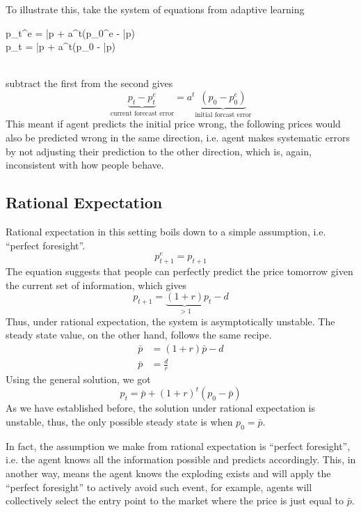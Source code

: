 \documentclass[twocolumn, fleqn]{article}
\begin{document}
				To illustrate this, take the system of equations from adaptive learning\\[4pt]
				\begin{cases}
						p_t^e = \bar{p} + a^t(p_0^e - \bar{p})\\
						p_t = \bar{p} + a^t(p_0 - \bar{p})
				\end{cases}\\[4pt]
				subtract the first from the second gives
				\begin{equation*}
						\underbrace{p_t - p_t^e}_{\text{current forecast error}} = a^t \underbrace{(p_0-p_0^e)}_{
						\text{initial
						forcast error}}
				\end{equation*}
				This meant if agent predicts the initial price wrong, the following prices would also be predicted wrong in the same direction, i.e. agent makes systematic errors by not adjusting their prediction to the other direction, which is, again, inconsistent with how people behave.

		\subsection{Rational Expectation}

			Rational expectation in this setting boils down to a simple assumption, i.e. ``perfect foresight''.
			\begin{equation*}
				p_{t+1}^e = p_{t+1}
			\end{equation*}
			The equation suggests that people can perfectly predict the price tomorrow given the current set of
			information, which gives
			\begin{equation*}
				p_{t+1} = \underbrace{(1+r)}_{>1}p_t -d
			\end{equation*}
			Thus, under rational expectation, the system is asymptotically unstable.
			The steady state value, on the other hand, follows the same recipe.
			\begin{align*}
				\bar{p} &= (1+r)\bar{p}-d\\
				\bar{p} &= \frac{d}{r}
			\end{align*}
			Using the general solution, we got
			\begin{equation*}
				p_t = \bar{p} + (1+r)^t(p_0-\bar{p})
			\end{equation*}
			As we have established before, the solution under rational expectation is unstable, thus, the only
			possible steady state is when $p_0=\bar{p}$.

			In fact, the assumption we make from rational expectation is ``perfect foresight'', i.e. the agent knows all the information possible and predicts accordingly.
			This, in another way, means the agent knows the exploding exists and will apply the ``perfect
			foresight'' to actively avoid such event, for example, agents will collectively select the entry point to the market where the price is just equal to $\bar{p}$.
\end{document}
